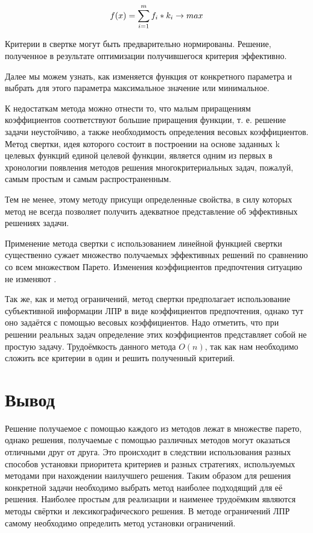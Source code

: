 \documentclass[a4paper,14pt]{report}
\begin{document}
\begin{equation}
f(x) = \sum\limits_{i=1}^m f_i * k_i \rightarrow max \\
\label{ref:func}
\end{equation}

Критерии в свертке могут быть предварительно нормированы. Решение, полученное в результате оптимизации получившегося критерия эффективно.

Далее мы можем узнать, как изменяется функция от конкретного параметра и выбрать для этого параметра максимальное значение или минимальное.

К недостаткам метода можно отнести то, что малым приращениям коэффициентов соответствуют большие приращения функции, т. е. решение задачи неустойчиво, а также необходимость определения весовых коэффициентов.
Метод свертки, идея которого состоит в построении на основе заданных k целевых функций единой целевой функции, является одним из первых в хронологии появления методов решения многокритериальных задач, пожалуй, самым простым и самым распространенным.  

Тем не менее, этому методу присущи определенные свойства, в силу которых метод не всегда позволяет получить адекватное представление об эффективных решениях задачи.

Применение метода свертки с использованием линейной функцией свертки существенно сужает множество получаемых эффективных решений по сравнению со всем множеством Парето. Изменения коэффициентов предпочтения ситуацию не изменяют \cite{vecopt}.

Так же, как и метод ограничений, метод свертки предполагает использование субъективной информации ЛПР в виде коэффициентов предпочтения, однако тут оно задаётся с помощью весовых коэффициентов. Надо отметить, что при решении реальных задач определение этих коэффициентов представляет собой не простую задачу.
Трудоёмкость данного метода $O(n)$, так как нам необходимо сложить все критерии в один и решить полученный критерий.  

\section{Вывод}
Решение получаемое с помощью каждого из методов лежат в множестве парето, однако решения, получаемые с помощью различных методов могут оказаться отличными друг от друга. Это происходит в следствии использования разных способов установки приоритета критериев и разных стратегиях, используемых методами при нахождении наилучшего решения. Таким образом для решения конкретной задачи необходимо выбрать метод наиболее подходящий для её решения. 
Наиболее простым для реализации и наименее трудоёмким являются методы свёртки и лексикографического решения. В методе ограничений ЛПР самому необходимо определить метод установки ограничений.
\end{document}

